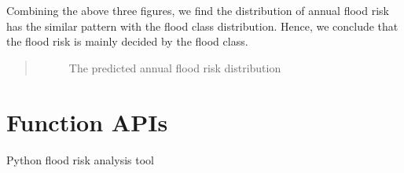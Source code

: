 \documentclass[letterpaper,10pt,english]{sphinxmanual}
\let\sphinxpxdimen\pdfpxdimen\else\newdimen\sphinxpxdimen
\begin{document}
\sphinxAtStartPar
Combining the above three figures, we find the distribution of annual flood risk has the similar pattern with the flood class distribution. Hence, we conclude that the flood risk is mainly decided by the flood class.
\begin{quote}

\begin{figure}[htbp]
\centering
\capstart

\noindent\sphinxincludegraphics[width=500\sphinxpxdimen]{{pic11}.png}
\caption{The predicted annual flood risk distribution}\label{\detokenize{index:id17}}\end{figure}
\end{quote}


\chapter{Function APIs}
\label{\detokenize{index:module-flood_tool}}\label{\detokenize{index:function-apis}}
\sphinxAtStartPar
Python flood risk analysis tool
\end{document}
